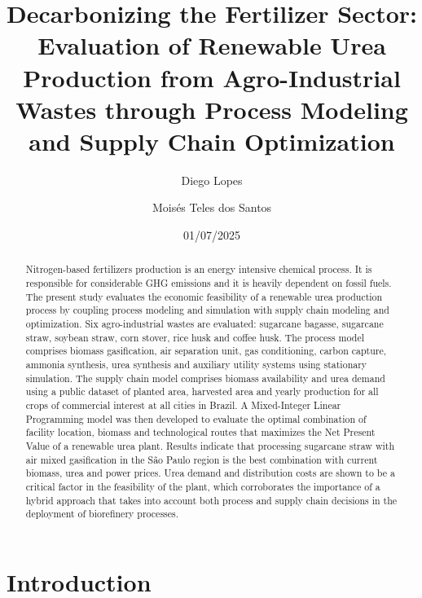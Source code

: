 \documentclass[a4paper, titlepage]{article}
\begin{document}
\title{Decarbonizing the Fertilizer Sector: Evaluation of Renewable Urea Production from Agro-Industrial Wastes through
    Process Modeling and Supply Chain Optimization }
\author{
    Diego Lopes\\
    \and
    Moisés Teles dos Santos}
\date{01/07/2025}
\maketitle


\begin{abstract}

    Nitrogen-based fertilizers production is an energy intensive chemical process. It is responsible for considerable
    GHG emissions and it is heavily dependent on fossil fuels. The present study evaluates the economic feasibility of a
    renewable urea production process by coupling process modeling and simulation with supply chain modeling and
    optimization. Six agro-industrial wastes are evaluated: sugarcane bagasse, sugarcane straw, soybean straw, corn
    stover, rice husk and coffee husk. The process model comprises biomass gasification, air separation unit, gas
    conditioning, carbon capture, ammonia synthesis, urea synthesis and auxiliary utility systems using stationary
    simulation. The supply chain model comprises biomass availability and urea demand using a public dataset of planted
    area, harvested area and yearly production for all crops of commercial interest at all cities in Brazil. A
    Mixed-Integer Linear Programming model was then developed to evaluate the optimal combination of facility location,
    biomass and technological routes that maximizes the Net Present Value of a renewable urea plant. Results indicate
    that processing sugarcane straw with air mixed gasification in the São Paulo region is the best combination with
    current biomass, urea and power prices. Urea demand and distribution costs are shown to be a critical factor in the
    feasibility of the plant, which corroborates the importance of a hybrid approach that takes into account both
    process and supply chain decisions in the deployment of biorefinery processes.

\end{abstract}

\section{Introduction}
\end{document}
